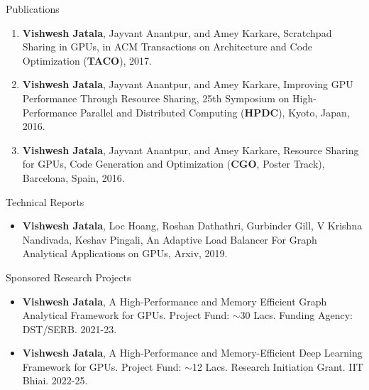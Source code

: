 \documentclass{resume} %
\begin{document}
\begin{rSection}{Publications}
\begin{enumerate}
\item \textbf{Vishwesh Jatala}, Jayvant Anantpur, and Amey Karkare, Scratchpad Sharing in GPUs, in ACM Transactions on Architecture and Code Optimization (\textbf{TACO}), 2017. 
\item \textbf{Vishwesh Jatala}, Jayvant Anantpur, and Amey Karkare, Improving GPU Performance Through Resource Sharing, 25th Symposium on High-Performance Parallel and Distributed Computing (\textbf{HPDC}), Kyoto, Japan, 2016.
\item \textbf{Vishwesh Jatala}, Jayvant Anantpur, and Amey Karkare, Resource Sharing for GPUs, Code Generation and Optimization (\textbf{CGO}, Poster Track), Barcelona, Spain, 2016.
\end{enumerate}
\end{rSection}


\begin{rSection}{Technical Reports}
\begin{itemize}
\item \textbf{Vishwesh Jatala}, Loc Hoang, Roshan Dathathri, Gurbinder Gill, V Krishna Nandivada, Keshav Pingali, An Adaptive Load Balancer For Graph Analytical Applications on GPUs, Arxiv, 2019. 
\end{itemize}
\end{rSection}


\begin{rSection}{Sponsored Research Projects}
	\begin{itemize}
		\item \textbf{Vishwesh Jatala}, A High-Performance and Memory Efficient Graph Analytical Framework for GPUs. Project Fund: $\sim$30 Lacs. Funding Agency: DST/SERB. 2021-23.
		\item \textbf{Vishwesh Jatala}, A High-Performance and Memory-Efficient Deep Learning Framework for GPUs. Project Fund: $\sim$12 Lacs. Research Initiation Grant. IIT Bhiai. 2022-25.
	\end{itemize}
\end{rSection}
\end{document}

